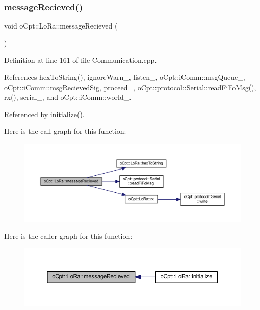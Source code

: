 \subsubsection{\texorpdfstring{message\+Recieved()}{messageRecieved()}}
{\footnotesize\ttfamily void o\+Cpt\+::\+Lo\+Ra\+::message\+Recieved (\begin{DoxyParamCaption}{ }\end{DoxyParamCaption})\hspace{0.3cm}{\ttfamily [protected]}}



Definition at line 161 of file Communication.\+cpp.



References hex\+To\+String(), ignore\+Warn\+\_\+, listen\+\_\+, o\+Cpt\+::i\+Comm\+::msg\+Queue\+\_\+, o\+Cpt\+::i\+Comm\+::msg\+Recieved\+Sig, proceed\+\_\+, o\+Cpt\+::protocol\+::\+Serial\+::read\+Fi\+Fo\+Msg(), rx(), serial\+\_\+, and o\+Cpt\+::i\+Comm\+::world\+\_\+.



Referenced by initialize().

Here is the call graph for this function\+:\nopagebreak
\begin{figure}[H]
\begin{center}
\leavevmode
\includegraphics[width=350pt]{classo_cpt_1_1_lo_ra_a606eeaec7fb73b483f958005444246b4_cgraph}
\end{center}
\end{figure}
Here is the caller graph for this function\+:\nopagebreak
\begin{figure}[H]
\begin{center}
\leavevmode
\includegraphics[width=350pt]{classo_cpt_1_1_lo_ra_a606eeaec7fb73b483f958005444246b4_icgraph}
\end{center}
\end{figure}
\hypertarget{classo_cpt_1_1_lo_ra_a6d4aa003a6ad9277998f34ee858b6264}{}\label{classo_cpt_1_1_lo_ra_a6d4aa003a6ad9277998f34ee858b6264} 
